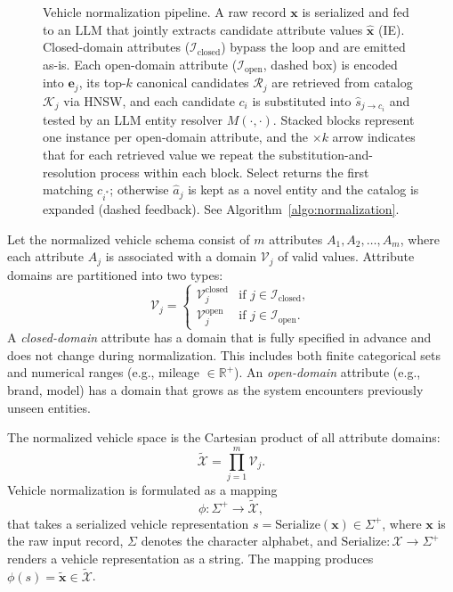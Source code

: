 \documentclass[conference]{IEEEtran}
\begin{document}
\begin{figure}[t]
{\begin{tikzpicture}
\end{tikzpicture}
}
\caption{Vehicle normalization pipeline. A raw record $\mathbf{x}$ is serialized and fed to an LLM that jointly extracts candidate attribute values $\hat{\mathbf{x}}$ (IE). Closed-domain attributes ($\mathcal{I}_{\text{closed}}$) bypass the loop and are emitted as-is. Each open-domain attribute ($\mathcal{I}_{\text{open}}$, dashed box) is encoded into $\mathbf{e}_j$, its top-$k$ canonical candidates $\mathcal{R}_j$ are retrieved from catalog $\mathcal{K}_j$ via HNSW, and each candidate $c_i$ is substituted into $\hat{s}_{j \to c_i}$ and tested by an LLM entity resolver $M(\cdot,\cdot)$. Stacked blocks represent one instance per open-domain attribute, and the $\times k$ arrow indicates that for each retrieved value we repeat the substitution-and-resolution process within each block. Select returns the first matching $c_{i^*}$; otherwise $\hat{a}_j$ is kept as a novel entity and the catalog is expanded (dashed feedback). See Algorithm~\ref{algo:normalization}.}
\label{fig:pipeline}
\end{figure}


Let the normalized vehicle schema consist of $m$ attributes
$A_1, A_2, \dots, A_m$, where each attribute $A_j$ is associated with a
domain $\mathcal{V}_j$ of valid values. Attribute domains are partitioned
into two types:
\begin{equation}
\mathcal{V}_j =
\begin{cases}
\mathcal{V}_j^{\text{closed}} & \text{if } j \in \mathcal{I}_{\text{closed}}, \\[4pt]
\mathcal{V}_j^{\text{open}} & \text{if } j \in \mathcal{I}_{\text{open}}.
\end{cases}
\end{equation}
A \textit{closed-domain} attribute has a domain that is fully specified
in advance and does not change during normalization. This includes both
finite categorical sets and numerical ranges (e.g., mileage
$\in \mathbb{R}^+$). An \textit{open-domain} attribute (e.g., brand,
model) has a domain that grows as the system encounters previously
unseen entities.


The normalized vehicle space is the Cartesian product of all attribute
domains:
\begin{equation}
\tilde{\mathcal{X}} = \prod_{j=1}^{m} \mathcal{V}_j.
\end{equation}
Vehicle normalization is formulated as a mapping
\begin{equation}
\phi: \Sigma^+ \to \tilde{\mathcal{X}},
\end{equation}
that takes a serialized vehicle representation
$s = \text{Serialize}(\mathbf{x}) \in \Sigma^+$, where $\mathbf{x}$ is
the raw input record, $\Sigma$ denotes the character alphabet, and
$\text{Serialize}: \mathcal{X} \to \Sigma^+$ renders a vehicle
representation as a string. The mapping produces
$\phi(s) = \tilde{\mathbf{x}} \in \tilde{\mathcal{X}}$.
\end{document}
